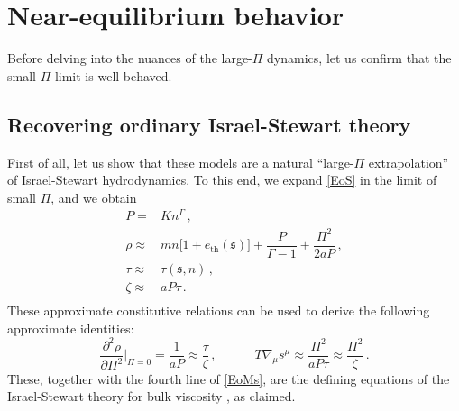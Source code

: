 \documentclass[a4paper, amsfonts, amssymb, amsmath, reprint, showkeys, nofootinbib, twoside,notitlepage,onecolumn]{revtex4-2}
\newcommand{\spc}{\quad \quad \quad}
\newcommand{\s}{{\mathfrak{s}}}
\theoremstyle{definition}
\theoremstyle{theorem}
\theoremstyle{corollary}
\begin{document}

\vspace{-0.3cm}
\section{Near-equilibrium behavior}
\vspace{-0.3cm}

Before delving into the nuances of the large-$\Pi$ dynamics, let us confirm that the small-$\Pi$ limit is well-behaved. 

\vspace{-0.4cm}
\subsection{Recovering ordinary Israel-Stewart theory}
\vspace{-0.4cm}

First of all, let us show that these models are a natural ``large-$\Pi$ extrapolation'' of Israel-Stewart hydrodynamics.
To this end, we expand \eqref{EoS} in the limit of small $\Pi$, and we obtain
\begin{equation}
\begin{split}
P={}& Kn^\Gamma \, ,\\
\rho \approx {}& mn\big[1+e_\text{th}(\s) \big]+  \dfrac{P}{\Gamma{-}1} + \dfrac{\Pi^2}{2aP} \, , \\
\tau \approx {}& \tau(\s,n) \, , \\
\zeta \approx {}& a P \tau \, . \\
\end{split}
\end{equation}
These approximate constitutive relations can be used to derive the following approximate identities:
\begin{equation}
\dfrac{\partial^2 \rho}{\partial \Pi^2}\bigg|_{\Pi=0}=  \dfrac{1}{aP} \approx \dfrac{\tau}{\zeta} \, , \spc
T\nabla_\mu s^\mu \approx  \dfrac{\Pi^2}{aP\tau} \approx \dfrac{\Pi^2}{\zeta} \, . 
\end{equation}
These, together with the fourth line of \eqref{EoMs}, are the defining equations of the Israel-Stewart theory for bulk viscosity \cite{Israel_Stewart_1979,Hishcock1983,BulkGavassino,GavassinoFarFromBulk2023}, as claimed.
\end{document}
